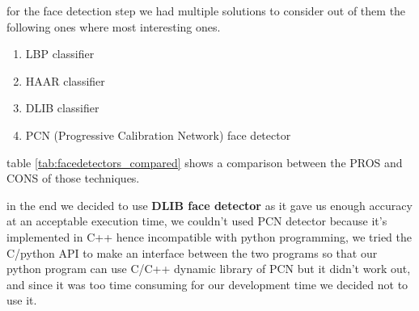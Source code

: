 for the face detection step we had multiple solutions to consider out of them the following ones where most interesting ones.
\begin{enumerate}
	\item LBP classifier
	\item HAAR classifier
	\item DLIB classifier
	\item PCN (Progressive Calibration Network) face detector
\end{enumerate}
table \ref{tab:facedetectors_compared} shows a comparison between the PROS and CONS of those techniques.\newline

in the end we decided to use \textbf{DLIB face detector} as it gave us enough accuracy at an acceptable execution time, 
we couldn't used PCN detector because it's implemented in C++ hence incompatible with python programming, we tried the C/python API to make an interface between the two programs so that our python program can use C/C++ dynamic library of PCN but it didn't work out, and since it was too time consuming for our development time we decided not to use it.

